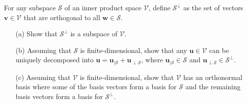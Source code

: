\documentclass{assignment}
\begin{document}
\begin{prob}
    For any subspace $\mathcal{S}$ of an inner product space $\mathcal{V}$, define $\mathcal{S}^{\perp}$ as the set of vectors $\bm{v}\in\mathcal{V}$ that are orthogonal to all $\bm{w}\in\mathcal{S}$.
    \begin{itemize}
        \item[(a)] Show that $\mathcal{S}^{\perp}$ is a subspace of $\mathcal{V}$.
        \item[(b)] Assuming that $\mathcal{S}$ is finite-dimensional, show that any $\bm{u}\in\mathcal{V}$ can be uniquely decomposed into $\bm{u}=\bm{u}_{\vert\mathcal{S}}+\bm{u}_{\perp\mathcal{S}}$, where $\bm{u}_{\vert\mathcal{S}}\in\mathcal{S}$ and $\bm{u}_{\perp\mathcal{S}}\in\mathcal{S}^{\perp}$.
        \item[(c)] Assuming that $\mathcal{V}$ is finite-dimensional, show that $\mathcal{V}$ has an orthonormal basis where some of the basis vectors form a basis for $\mathcal{S}$ and the remaining basis vectors form a basis for $\mathcal{S}^{\perp}$.
    \end{itemize}
\end{prob}
\end{document}
